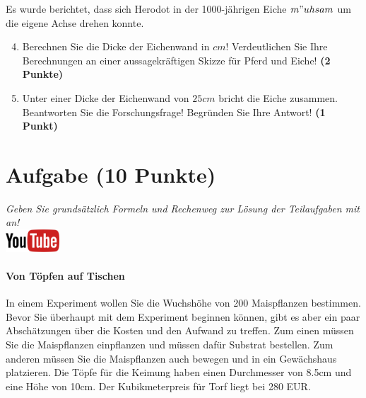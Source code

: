 \documentclass[a4paper, 9pt]{scrartcl}\usepackage[]{graphicx}\usepackage[]{xcolor}
\begin{document}
Es wurde berichtet, dass sich Herodot in der 1000-j{\"a}hrigen Eiche
$m{"u}hsam$ um die eigene Achse drehen konnte.

\begin{enumerate}
  \setcounter{enumi}{3}
\item Berechnen Sie die Dicke der Eichenwand in $cm$! Verdeutlichen Sie Ihre
  Berechnungen an einer aussagekr{\"a}ftigen Skizze f{\"u}r Pferd und Eiche! \textbf{(2 Punkte)} 
\item Unter einer Dicke der Eichenwand von $25cm$ bricht
  die Eiche zusammen. Beantworten Sie die Forschungsfrage! Begr{\"u}nden Sie
  Ihre Antwort! \textbf{(1 Punkt)} 
\end{enumerate}
 
\clearpage

\section{Aufgabe \hfill (10 Punkte)}

\textit{Geben Sie grunds{\"a}tzlich Formeln und Rechenweg zur L{\"o}sung der
  Teilaufgaben mit an!} \\[1Ex]

\hfill\href{https://youtu.be/57B-yYoFSk0}{\includegraphics[width =
  2cm]{img/youtube}} %
\hspace{2Ex}

\paragraph{Von T{\"o}pfen auf Tischen}



In einem Experiment wollen Sie die Wuchsh{\"o}he von 200
Maispflanzen bestimmen. Bevor Sie {\"u}berhaupt mit dem Experiment beginnen
k{\"o}nnen, gibt es aber ein paar Absch{\"a}tzungen {\"u}ber die Kosten und den Aufwand
zu treffen. Zum einen m{\"u}ssen Sie die Maispflanzen einpflanzen und m{\"u}ssen
daf{\"u}r Substrat bestellen. Zum anderen m{\"u}ssen Sie die Maispflanzen auch
bewegen und in ein Gew{\"a}chshaus platzieren. Die T{\"o}pfe f{\"u}r die Keimung haben
einen Durchmesser von 8.5cm und eine H{\"o}he von 10cm. Der
Kubikmeterpreis f{\"u}r Torf liegt bei 280 EUR.
\end{document}
